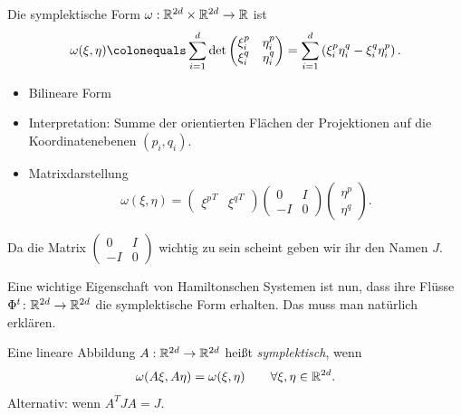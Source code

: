 \begin{definition}
	Die symplektische Form $\omega: \mathbb R^{2d} \times \mathbb R^{2d} \to \mathbb R$ ist
	\begin{equation*}
		\omega(\xi, \eta)
		\colonequals \sum_{i=1}^d \det\begin{pmatrix} \xi_i^p & \eta_i^p \\ \xi_i^q & \eta_i^q \end{pmatrix}
		= \sum_{i=1}^d \left( \xi_i^p \eta_i^q - \xi_i^q \eta_i^p \right).
	\end{equation*}
\end{definition}

\begin{itemize}
	\item Bilineare Form
	\item Interpretation: Summe der orientierten Flächen der Projektionen auf die Koordinatenebenen $(p_i, q_i)$.
	\item Matrixdarstellung
	\begin{equation*}
		\omega(\xi, \eta) =
		\begin{pmatrix} {\xi^p}^T & {\xi^q}^T \end{pmatrix}
		\begin{pmatrix} 0 & I \\ -I & 0 \end{pmatrix}
		\begin{pmatrix} \eta^p \\ \eta^q \end{pmatrix}.
	\end{equation*}
\end{itemize}

Da die Matrix $\begin{pmatrix} 0 & I \\ -I & 0 \end{pmatrix}$ wichtig zu sein scheint geben wir ihr den Namen $J$.

Eine wichtige Eigenschaft von Hamiltonschen Systemen ist nun, dass ihre Flüsse $\Phi^t \colon \mathbb R^{2d} \to \mathbb R^{2d}$ die symplektische Form erhalten. Das muss man natürlich erklären.

\begin{definition}
	Eine lineare Abbildung $A: \mathbb R^{2d} \to \mathbb R^{2d}$ heißt \emph{symplektisch}, wenn
	\begin{equation*}
		\omega(A\xi, A\eta) = \omega(\xi, \eta) \qquad \forall \xi, \eta \in \mathbb R^{2d}.
	\end{equation*}
	Alternativ: wenn $A^T J A = J$.
\end{definition}

